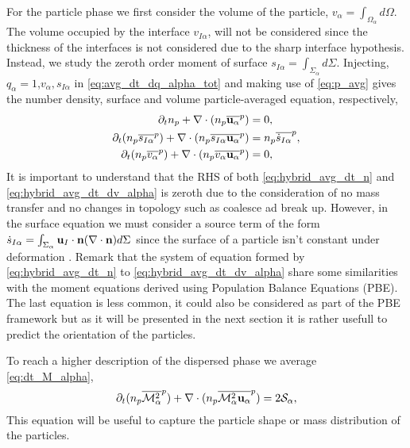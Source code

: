 For the particle phase we first consider the volume of the particle, $v_\alpha = \int_{\Omega_\alpha} d\Omega$.
The volume occupied by the interface $v_{I\alpha}$, will not be considered since the thickness of the interfaces is not considered due to the sharp interface  hypothesis.
Instead,  we study the zeroth order moment of surface $s_{I\alpha} = \int_{\Sigma_\alpha} d\Sigma$. 
Injecting, $q_\alpha = 1$,$v_\alpha, s_{I\alpha}$ in \ref{eq:avg_dt_dq_alpha_tot} and making use of \ref{eq:p_avg} gives the number density, surface and volume particle-averaged equation, respectively,
\begin{align}
    \partial_t n_p
    + \mathbf{\nabla} \cdot (n_p\overline{\textbf{u}_\alpha}^{p})
    &= 
    0,
    \label{eq:hybrid_avg_dt_n}\\
    \partial_t (n_p\overline{s_{I\alpha}}^{p})
    + \mathbf{\nabla} \cdot (n_p\overline{s_{I\alpha}\textbf{u}_\alpha}^{p})
    &= n_p\overline{\dot{s}_{I\alpha}}^{p},
    \label{eq:hybrid_avg_dt_ds_alpha}\\
    \partial_t (n_p\overline{v_\alpha}^{p})
    + \mathbf{\nabla} \cdot (n_p\overline{v_\alpha\textbf{u}_\alpha}^{p})
    &= 0,
    \label{eq:hybrid_avg_dt_dv_alpha}\\
\end{align}
It is important to understand that the RHS of both \ref{eq:hybrid_avg_dt_n} and \ref{eq:hybrid_avg_dt_dv_alpha} is zeroth due to the consideration of no mass transfer and no changes in topology such as coalesce ad break up.
However, in the surface equation we must consider a source term of the form $\dot{s}_{I\alpha} = \int_{\Sigma_\alpha} \textbf{u}_I \cdot \textbf{n}(\mathbf{\nabla} \cdot \textbf{n}) d\Sigma$ since the surface of a particle isn't constant under deformation \citep{morel2007surface}. 
Remark that the system of equation formed by \ref{eq:hybrid_avg_dt_n} to \ref{eq:hybrid_avg_dt_dv_alpha} share some similarities with the moment equations derived using Population Balance Equations (PBE)\citet{KAMP20011363,marchisio2013computational}.
The last equation is less common, it could also be considered as part of the PBE framework but as it will be presented in the next section it is rather usefull to predict the orientation of the particles. 

To reach a higher description of the dispersed phase we average \ref{eq:dt_M_alpha}, 
\begin{equation*}
    \partial_t (n_p\overline{\mathcal{M}^2_\alpha}^{p})
    + \mathbf{\nabla} \cdot (
        n_p\overline{\mathcal{M}^2_\alpha\textbf{u}_\alpha}^{p}
        )
    = 2\mathcal{S}_\alpha,
    \label{eq:hybrid_avg_dt_dM_alpha}
\end{equation*}
This equation will be useful to capture the particle shape or mass distribution of the particles. 

